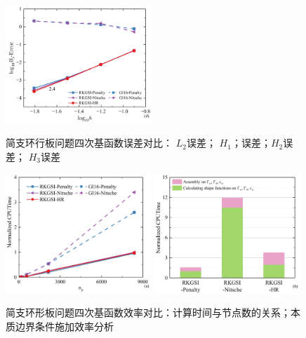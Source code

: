 \begin{figure}[H]
\begin{subcaptiongroup}
    \label{QH2}
    \includegraphics[width=0.49\textwidth]{figure/PHR/A/QH3.png}
    \label{QH3}
    \end{subcaptiongroup}
\caption{简支环行板问题四次基函数误差对比： $L_2$误差； $H_1$；误差；$H_2$误差； $H_3$误差}
\label{AQLH}
\end{figure}
\begin{figure}[H]
    \centering
    \begin{subcaptiongroup}
    \includegraphics[width=0.49\textwidth]{figure/PHR/A/Qcputime.png}
    \label{Qcputime}
    \includegraphics[width=0.49\textwidth]{figure/PHR/A/Qefficiency.png}
    \label{Qefficiency}
    \end{subcaptiongroup}
\caption{简支环形板问题四次基函数效率对比：计算时间与节点数的关系；本质边界条件施加效率分析}
\label{AQcputime}
\end{figure}
